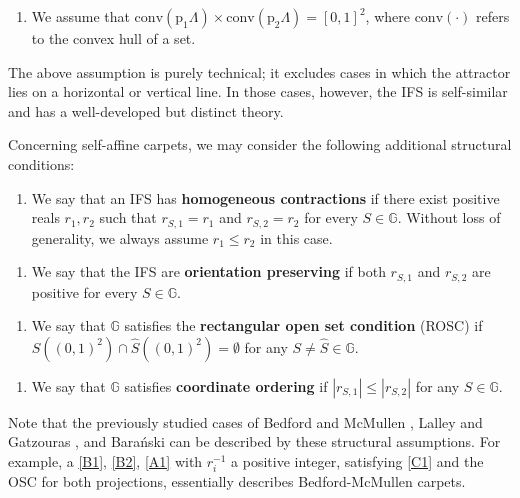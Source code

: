 \documentclass[a4paper, 11pt]{article}
\numberwithin{equation}{section}
\theoremstyle{plain}
\theoremstyle{remark}
\theoremstyle{definition}
\begin{document}
\begin{enumerate}[label = $\circ$, ref= CC]
\item\label{A2} We assume that $\mathrm{conv}(\mathrm{p}_1\Lambda) \times \mathrm{conv}(\mathrm{p}_2\Lambda) = [0,1]^2$, where $\mathrm{conv}(\cdot)$ refers to the convex hull of a set.
\end{enumerate}

The above assumption is purely technical; it excludes cases in which the attractor lies on a horizontal or vertical line. In those cases, however, the IFS is self-similar and has a well-developed but distinct theory.

Concerning self-affine carpets, we may consider the following additional structural conditions:

\begin{enumerate}[label = $\circ$, ref = homogeneous]
\item \label{B1} We say that an IFS has \textbf{homogeneous contractions} if there exist positive reals $r_1, r_2$ such that $r_{S,1}=r_1$ and $r_{S,2}=r_2$ for every $S\in\mathbb{G}$. Without loss of generality, we always assume $r_1\leq r_2$ in this case.
\end{enumerate}

\begin{enumerate}[label = $\circ$, ref = orientation preserving]
\item\label{B2} We say that the IFS are \textbf{orientation preserving} if both $r_{S,1}$ and $r_{S,2}$ are positive for every $S\in\mathbb{G}$.
\end{enumerate}

\begin{enumerate}[label = $\circ$, ref = ROSC]
\item\label{C1} We say that $\mathbb{G}$ satisfies the \textbf{rectangular open set condition} (ROSC) if $S((0,1)^2) \cap \hat{S}((0,1)^2) = \emptyset$ for any $S\neq \hat{S} \in \mathbb{G}$.
\end{enumerate}

\begin{enumerate}[label = $\circ$, ref = coordinate ordering]
\item\label{G1} We say that $\mathbb{G}$ satisfies \textbf{coordinate ordering} if $|r_{S,1}| \leq |r_{S,2}|$ for any $S\in\mathbb{G}$.
\end{enumerate}

Note that the previously studied cases of Bedford \cite{bedford1984crinkly} and McMullen \cite{McMullen}, Lalley and Gatzouras \cite{MR1183358}, and Bara\'nski \cite{MR2298824} can be described by these structural assumptions. For example, a \ref{B1}, \ref{B2}, \ref{A1} with $r_i^{-1}$ a positive integer, satisfying \ref{C1} and the OSC for both projections, essentially describes Bedford-McMullen carpets.
\end{document}
